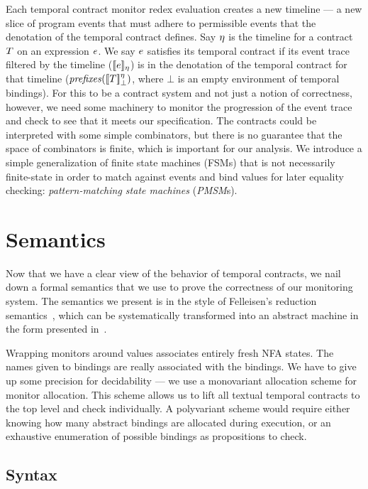 Each temporal contract monitor redex evaluation creates a new timeline --- a new slice of program events that must adhere to permissible events that the denotation of the temporal contract defines.
%
Say $\eta$ is the timeline for a contract $T$ on an expression $e$.
%
We say $e$ satisfies its temporal contract if its event trace filtered by the timeline ($[\![ e ]\!]_\eta$) is in the denotation of the temporal contract for that timeline ($\mathit{prefixes}([\![ T ]\!]^{\eta}_{\bot})$, where $\bot$ is an empty environment of temporal bindings).
%
For this to be a contract system and not just a notion of correctness, however, we need some machinery to monitor the progression of the event trace and check to see that it meets our specification.
%
The contracts could be interpreted with some simple combinators, but there is no guarantee that the space of combinators is finite, which is important for our analysis.
%
We introduce a simple generalization of finite state machines (FSMs) that is not necessarily finite-state in order to match against events and bind values for later equality checking: \emph{pattern-matching state machines} (\emph{PMSM}s).

\section{Semantics}\label{sec:technical}

Now that we have a clear view of the behavior of temporal contracts, we nail down a formal semantics that we use to prove the correctness of our monitoring system.
%
The semantics we present is in the style of Felleisen's reduction semantics~\citep{ianjohnson:Felleisen:2009:SEP:1795772}, which can be systematically transformed into an abstract machine in the form presented in~\citet{dvanhorn:VanHorn2010Abstracting}.

Wrapping monitors around values associates entirely fresh NFA states.
%
The names given to bindings are really associated with the bindings.
%
We have to give up some precision for decidability --- we use a monovariant allocation scheme for monitor allocation.
%
This scheme allows us to lift all textual temporal contracts to the top level and check individually.
%
A polyvariant scheme would require either knowing how many abstract bindings are allocated during execution, or an exhaustive enumeration of possible bindings as propositions to check.

\subsection{Syntax}
\FloatBarrier

